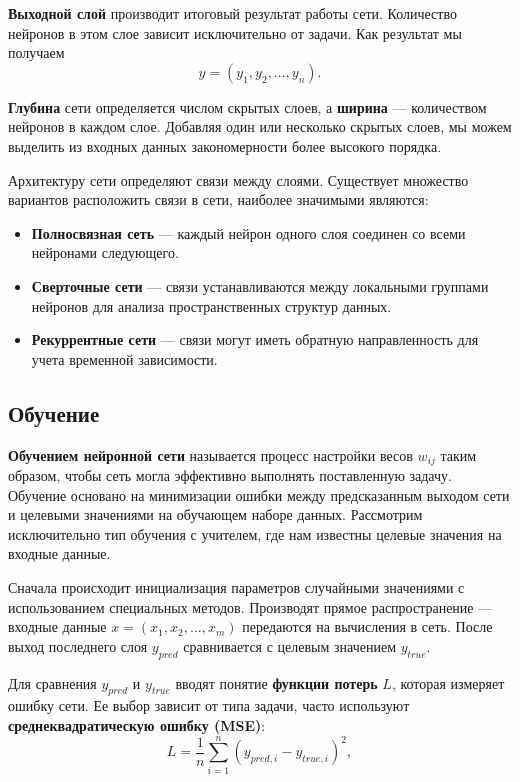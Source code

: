 \documentclass[12pt, a4paper]{article}
\begin{document}
\textbf{Выходной слой} производит итоговый результат работы сети. Количество нейронов в этом слое зависит исключительно от задачи. Как результат мы получаем 
  \begin{equation}
	y = (y_1, y_2, ..., y_n).
	\label{4}
\end{equation}


 \textbf{Глубина} сети определяется числом скрытых слоев, а \textbf{ширина} — количеством нейронов в каждом слое.  Добавляя один или несколько скрытых слоев, мы можем выделить  из входных данных закономерности более высокого порядка. 
 
 Архитектуру сети определяют связи между слоями. Существует множество вариантов расположить связи в сети, наиболее значимыми являются:
 \begin{itemize}
 	\item \textbf{Полносвязная сеть} --- каждый нейрон одного слоя соединен со всеми нейронами следующего.
 	\item \textbf{Сверточные сети} --- связи устанавливаются между локальными группами нейронов для анализа пространственных структур данных.
 	\item \textbf{Рекуррентные сети} --- связи могут иметь обратную направленность для учета временной зависимости. 
 \end{itemize}
  
 \newpage
\subsection{Обучение}
\textbf{Обучением нейронной сети} называется процесс настройки весов $w_{ij}$ таким образом, чтобы сеть могла эффективно выполнять поставленную задачу. Обучение основано на минимизации ошибки между предсказанным выходом сети и целевыми значениями на обучающем наборе данных. Рассмотрим исключительно тип обучения с учителем, где нам известны целевые значения на входные данные. \cite{2}

Сначала происходит инициализация параметров случайными значениями с использованием специальных методов. Производят прямое распространение --- входные данные $x = (x_1, x_2, ..., x_m)$ передаются на вычисления в сеть. После выход последнего слоя $y_{pred}$ сравнивается с целевым значением $y_{true}$.

Для сравнения $y_{pred}$ и $y_{true}$ вводят понятие \textbf{функции потерь} $L$, которая измеряет ошибку сети. Ее выбор зависит от типа задачи, часто используют \textbf{среднеквадратическую ошибку (MSE)}:
\begin{equation}
	L = \frac{1}{n} \sum_{i=1}^{n} (y_{pred, i} - y_{true, i})^2,
\end{equation}
\end{document}
